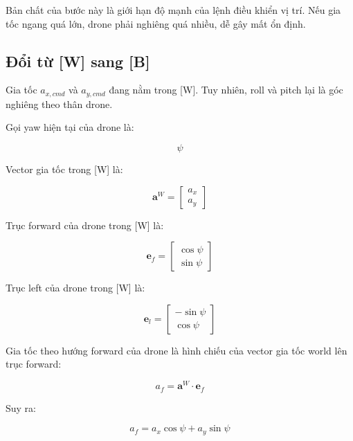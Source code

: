 Bản chất của bước này là giới hạn độ mạnh của lệnh điều khiển vị trí.
Nếu gia tốc ngang quá lớn, drone phải nghiêng quá nhiều, dễ gây mất ổn định.

\subsection{Đổi từ [W] sang [B]}

Gia tốc $a_{x,cmd}$ và $a_{y,cmd}$ đang nằm trong [W].
Tuy nhiên, roll và pitch lại là góc nghiêng theo thân drone.

Gọi yaw hiện tại của drone là:

\begin{equation}
    \psi
\end{equation}

Vector gia tốc trong [W] là:

\begin{equation}
    \mathbf{a}^{W}
    =
    \begin{bmatrix}
        a_x \\
        a_y
    \end{bmatrix}
\end{equation}

Trục forward của drone trong [W] là:

\begin{equation}
    \mathbf{e}_f
    =
    \begin{bmatrix}
        \cos\psi \\
        \sin\psi
    \end{bmatrix}
\end{equation}

Trục left của drone trong [W] là:

\begin{equation}
    \mathbf{e}_l
    =
    \begin{bmatrix}
        -\sin\psi \\
        \cos\psi
    \end{bmatrix}
\end{equation}

Gia tốc theo hướng forward của drone là hình chiếu của vector gia tốc world
lên trục forward:

\begin{equation}
    a_f
    =
    \mathbf{a}^{W} \cdot \mathbf{e}_f
\end{equation}

Suy ra:

\begin{equation}
    a_f
    =
    a_x\cos\psi + a_y\sin\psi
\end{equation}


